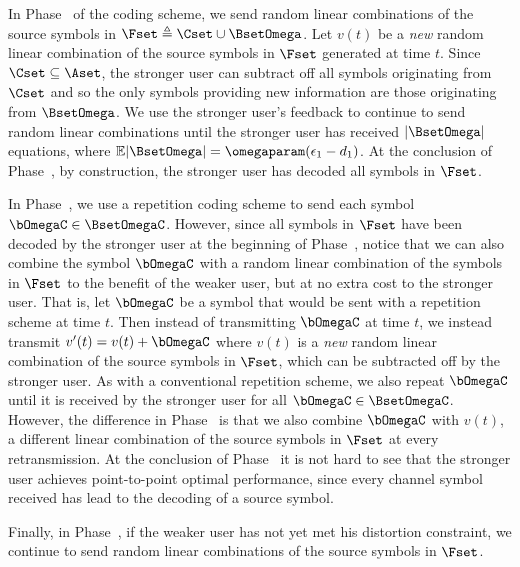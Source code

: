 In Phase~ of the coding scheme, we send random linear combinations of the source symbols in $\Fset \triangleq \Cset \cup \BsetOmega$.  Let $v(t)$ be a \emph{new} random linear combination of the source symbols in $\Fset$ generated at time $t$.  Since $\Cset \subseteq \Aset$, the stronger user can subtract off all symbols originating from $\Cset$ and so the only symbols providing new information are those originating from $\BsetOmega$.  We use the stronger user's feedback to continue to send random linear combinations until the stronger user has received $|\BsetOmega|$ equations, where $\mathbb{E}|\BsetOmega| = \omegaparam(\epsilon_1 - d_1)$.  At the conclusion of Phase~, by construction, the stronger user has decoded all symbols in $\Fset$.

In Phase~, we use a repetition coding scheme to send each symbol $\bOmegaC \in \BsetOmegaC$.  However, since all symbols in $\Fset$ have been decoded by the stronger user at the beginning of Phase~, notice that we can also combine the symbol $\bOmegaC$ with a random linear combination of the symbols in $\Fset$ to the benefit of the weaker user, but at no extra cost to the stronger user.  That is, let $\bOmegaC$ be a symbol that would be sent with a repetition scheme at time $t$.  Then instead of transmitting $\bOmegaC$ at time $t$, we instead transmit $v'(t) = v(t) + \bOmegaC$ where $v(t)$ is a \emph{new} random linear combination of the source symbols in $\Fset$, which can be subtracted off by the stronger user.
As with a conventional repetition scheme, we also repeat $\bOmegaC$ until it is received by the stronger user for all $\bOmegaC \in \BsetOmegaC$.  However, the difference in Phase~ is that we also combine $\bOmegaC$ with $v(t)$, a different linear combination of the source symbols in $\Fset$ at every retransmission.  At the conclusion of Phase~ it is not hard to see that the stronger user achieves point-to-point optimal performance, since every channel symbol received has lead to the decoding of a source symbol.  

Finally, in Phase~, if the weaker user has not yet met his distortion constraint, we continue to send random linear combinations of the source symbols in $\Fset$.



